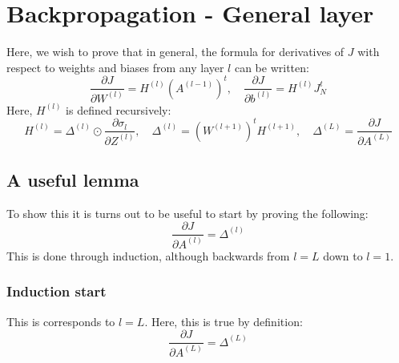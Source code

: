 \documentclass[12pt, a4paper]{article}
\numberwithin{equation}{section}
\begin{document}
\section{Backpropagation - General layer}
Here, we wish to prove that in general, the formula for derivatives of $J$ with respect to weights and biases from any layer $l$ can be written:
\begin{equation}
\frac{\partial J}{\partial W^{(l)}}=H^{(l)}\left(A^{(l-1)}\right)^t,\quad \frac{\partial J}{\partial b^{(l)}}=H^{(l)}J_N^t
\end{equation}
Here, $H^{(l)}$ is defined recursively:
\begin{equation}
H^{(l)}=\Delta^{(l)}\odot\frac{\partial\sigma_l}{\partial Z^{(l)}},\quad \Delta^{(l)}=\left(W^{(l+1)}\right)^t H^{(l+1)},\quad \Delta^{(L)}=\frac{\partial J}{\partial A^{(L)}}
\end{equation}

\subsection{A useful lemma}
To show this it is turns out to be useful to start by proving the following:
\begin{equation}
\frac{\partial J}{\partial A^{(l)}}=\Delta^{(l)}
\end{equation}
This is done through induction, although backwards from $l=L$ down to $l=1$.

\subsubsection{Induction start}
This is corresponds to $l=L$. Here, this is true by definition:
\begin{equation}
\frac{\partial J}{\partial A^{(L)}}=\Delta^{(L)}
\end{equation}
\end{document}
